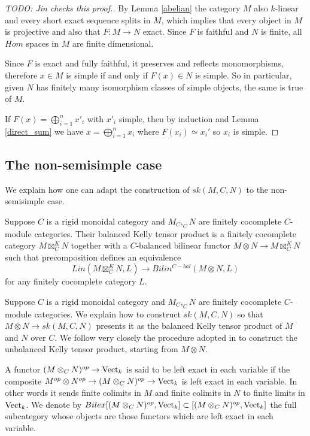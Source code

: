 \begin{proof}
  [TODO: Jin checks this proof.]

  By Lemma \ref{abelian} the category $M$ also $k$-linear and every short exact sequence splits in $M$, which implies that every object in $M$ is projective and also that $F:M\to N$ exact. Since $F$ is faithful and $N$ is finite, all $Hom$ spaces in $M$ are finite dimensional.

  Since $F$ is exact and fully faithful, it preserves and reflects
  monomorphisms, therefore $x\in M$ is simple if and only if $F(x)\in N$ is
  simple. So in particular, given $N$ has finitely many isomorphism classes of
  simple objects, the same is true of $M$.

  If $F(x)=\bigoplus_{i=1}^n x'_i$ with $x'_i$ simple, then by induction and
  Lemma \ref{direct_sum} we have $x=\bigoplus_{i=1}^n x_i$ where
  $F(x_i)\simeq x_i'$ so $x_i$ is simple.
\end{proof}

\subsection{The non-semisimple case}

We explain how one can adapt the construction of $sk(M,C,N)$ to the non-semisimple case. 

\begin{definition}
Suppose $C$ is a rigid monoidal category and $M_C, _{C}N$ are finitely cocomplete $C$-module categories. Their balanced Kelly tensor product is a finitely cocomplete category $M\boxtimes^K_C N$ together with a $C$-balanced bilinear functor $M\otimes N\to M\boxtimes^K_C N$ such that precomposition defines an equivalence $$Lin(M\boxtimes^K_C N,L)\to Bilin^{C-bal}(M\otimes N, L)$$ for any finitely cocomplete category $L$.\end{definition}

Suppose $C$ is a rigid monoidal category and $M_C, _{C}N$ are finitely cocomplete $C$-module categories. We explain how to construct $sk(M,C,N)$ so that $M\otimes N\to sk(M,C,N)$ presents it as the balanced Kelly tensor product of $M$ and $N$ over $C$. We follow very closely the procedure adopted in \cite{lopezfranco/tensor-products} to construct the unbalanced Kelly tensor product, starting from $M\otimes N$.

\begin{definition}

A functor $(M\otimes_C N)^{op}\to \operatorname{Vect}_k$ is said to be left exact in each variable if the composite $M^{op}\otimes N^{op}\to (M\otimes_C N)^{op}\to \operatorname{Vect}_k$ is left exact in each variable. In other words it sends finite colimits in $M$ and finite colimits in $N$ to finite limits in $\operatorname{Vect}_k$. We denote by $Bilex[(M\otimes_C N)^{op},\operatorname{Vect}_k]\subset [(M\otimes_C N)^{op},\operatorname{Vect}_k]$ the full subcategory whose objects are those functors which are left exact in each variable.
\end{definition}
 
